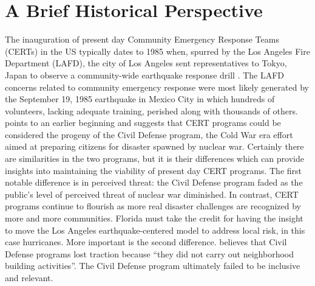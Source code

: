 \documentclass[11pt,fleqn]{book} %
\begin{document}





\pagestyle{empty} %

\renewcommand\contentsname{Table of Contents}
\renewcommand{\bibname}{Bibliography}
\tableofcontents%


\pagestyle{fancy} %

\chapter{A Brief Historical Perspective}

The inauguration of present day Community Emergency Response Teams (CERTs) in the US typically dates to 1985 when, spurred by the Los Angeles Fire Department (LAFD), the city of Los Angeles sent representatives to Tokyo, Japan to observe a community-wide earthquake response drill \autocite{simpson_community_2001}. The LAFD concerns related to community emergency response were most likely generated by the September 19, 1985 earthquake in Mexico City in which hundreds of volunteers, lacking adequate training, perished along with thousands of others. \textcite{simpson_community_2001} points to an earlier beginning and suggests that CERT programs could be considered the progeny of the Civil Defense program, the Cold War era effort aimed at preparing citizens for disaster spawned by nuclear war. Certainly there are similarities in the two programs, but it is their differences which can provide insights into maintaining the viability of present day CERT programs. The first notable difference is in perceived threat: the Civil Defense program faded as the public's level of perceived threat of nuclear war diminished. In contrast, CERT programs continue to flourish as more real disaster challenges are recognized by more and more communities. Florida must take the credit for having the insight to move the Los Angeles earthquake-centered model to address local risk, in this case hurricanes. More important is the second difference. \textcite{simpson_community_2001} believes that Civil Defense programs lost traction because \enquote{they did not carry out neighborhood building activities}. The Civil Defense program ultimately failed to be inclusive and relevant.\\
\end{document}
